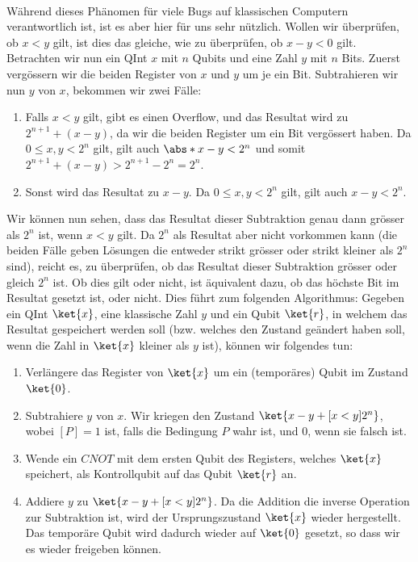 \paragraph{}
Während dieses Phänomen für viele Bugs auf klassischen Computern verantwortlich ist, ist es aber hier für uns sehr nützlich. Wollen wir überprüfen, ob $x < y$ gilt, ist dies das gleiche, wie zu überprüfen, ob $x - y < 0$ gilt. Betrachten wir nun ein QInt $x$ mit $n$ Qubits und eine Zahl $y$ mit $n$ Bits. Zuerst vergössern wir die beiden Register von $x$ und $y$ um je ein Bit. Subtrahieren wir nun $y$ von $x$, bekommen wir zwei Fälle:
\begin{enumerate}
    \item Falls $x < y$ gilt, gibt es einen Overflow, und das Resultat wird zu $2^{n + 1} + (x - y)$, da wir die beiden Register um ein Bit vergössert haben. Da $0 \leq x, y < 2^n$ gilt, gilt auch $\abs*{x - y} < 2^n$ und somit $2^{n + 1} + (x - y) > 2^{n + 1} - 2^n = 2^n$.
    \item Sonst wird das Resultat zu $x - y$. Da $0 \leq x, y < 2^n$ gilt, gilt auch $x - y < 2^n$.
\end{enumerate}
Wir können nun sehen, dass das Resultat dieser Subtraktion genau dann grösser als $2^n$ ist, wenn $x < y$ gilt. Da $2^n$ als Resultat aber nicht vorkommen kann (die beiden Fälle geben Lösungen die entweder strikt grösser oder strikt kleiner als $2^n$ sind), reicht es, zu überprüfen, ob das Resultat dieser Subtraktion grösser oder gleich $2^n$ ist. Ob dies gilt oder nicht, ist äquivalent dazu, ob das höchste Bit im Resultat gesetzt ist, oder nicht. Dies führt zum folgenden Algorithmus:
Gegeben ein QInt $\ket{x}$, eine klassische Zahl $y$ und ein Qubit $\ket{r}$, in welchem das Resultat gespeichert werden soll (bzw. welches den Zustand geändert haben soll, wenn die Zahl in $\ket{x}$ kleiner als $y$ ist), können wir folgendes tun:

\begin{enumerate}
    \item Verlängere das Register von $\ket{x}$ um ein (temporäres) Qubit im Zustand $\ket{0}$.
    \item Subtrahiere $y$ von $x$. Wir kriegen den Zustand $\ket{x - y + [x < y]2^n}$, wobei $[P] = 1$ ist, falls die Bedingung $P$ wahr ist, und $0$, wenn sie falsch ist.
    \item Wende ein $CNOT$ mit dem ersten Qubit des Registers, welches $\ket{x}$ speichert, als Kontrollqubit auf das Qubit $\ket{r}$ an.
    \item Addiere $y$ zu $\ket{x - y + [x < y]2^n}$. Da die Addition die inverse Operation zur Subtraktion ist, wird der Ursprungszustand $\ket{x}$ wieder hergestellt. Das temporäre Qubit wird dadurch wieder auf $\ket{0}$ gesetzt, so dass wir es wieder  freigeben können.
\end{enumerate}

